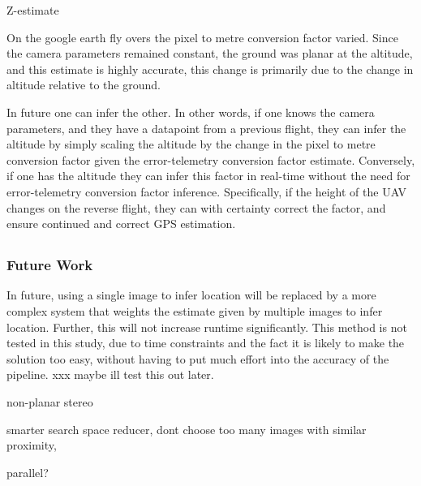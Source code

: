 Z-estimate

On the google earth fly overs the pixel to metre conversion factor varied. 
Since the camera parameters remained constant, the ground was planar at the altitude, and this estimate is highly accurate, this change is primarily due to the change in altitude relative to the ground. 

In future one can infer the other. In other words, if one knows the camera parameters, and they have a datapoint from a previous flight, they can infer the altitude by simply scaling the altitude by the change in the pixel to metre conversion factor given the error-telemetry conversion factor estimate.
Conversely, if one has the altitude they can infer this factor in real-time without the need for error-telemetry conversion factor inference. Specifically, if the height of the UAV changes on the reverse flight, they can with certainty correct the factor, and ensure continued and correct GPS estimation. 




\subsection*{}

\subsubsection*{Future Work}
In future, using a single image to infer location will be replaced by a more complex system that weights the estimate given by multiple images to infer location. Further, this will not increase runtime significantly. This method is not tested in this study, due to time constraints and the fact it is likely to make the solution too easy, without having to put much effort into the accuracy of the pipeline. xxx maybe ill test this out later. 

non-planar stereo 


smarter search space reducer, dont choose too many images with similar proximity, 


parallel?